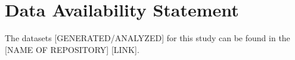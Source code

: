 \documentclass[utf8]{FrontiersinHarvard} %
\begin{document}
	\section*{Data Availability Statement}
	The datasets [GENERATED/ANALYZED] for this study can be found in the [NAME OF REPOSITORY] [LINK].
	
	
	
	
	
\end{document}
